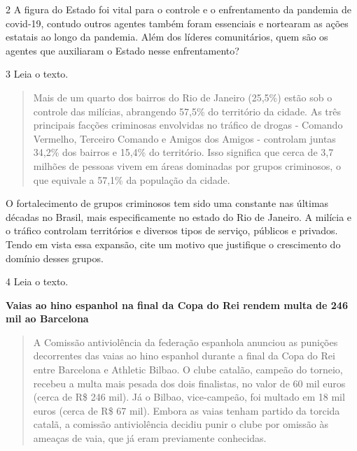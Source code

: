 \num{2} A figura do Estado foi vital para o controle e o enfrentamento
da pandemia de covid-19, contudo outros agentes também foram essenciais
e nortearam as ações estatais ao longo da pandemia. Além dos líderes
comunitários, quem são os agentes que auxiliaram o Estado nesse
enfrentamento?


\num{3} Leia o texto.

\begin{quote}
Mais de um quarto dos bairros do Rio de Janeiro (25,5\%) estão sob o
controle das milícias, abrangendo 57,5\% do território da cidade. As
três principais facções criminosas envolvidas no tráfico de drogas -
Comando Vermelho, Terceiro Comando e Amigos dos Amigos - controlam
juntas 34,2\% dos bairros e 15,4\% do território. Isso significa que
cerca de 3,7 milhões de pessoas vivem em áreas dominadas por grupos
criminosos, o que equivale a 57,1\% da população da cidade.
\end{quote}


O fortalecimento de grupos criminosos tem sido uma constante nas últimas
décadas no Brasil, mais especificamente no estado do Rio de Janeiro. A
milícia e o tráfico controlam territórios e diversos tipos de serviço,
públicos e privados. Tendo em vista essa expansão, cite um motivo que
justifique o crescimento do domínio desses grupos.


\num{4} Leia o texto.

\textbf{Vaias ao hino espanhol na final da Copa do Rei rendem multa de 246 mil ao Barcelona}

\begin{quote}
A Comissão antiviolência da federação espanhola anunciou as punições
decorrentes das vaias ao hino espanhol durante a final da Copa do Rei
entre Barcelona e Athletic Bilbao. O clube catalão, campeão do torneio,
recebeu a multa mais pesada dos dois finalistas, no valor de 60 mil
euros (cerca de R\$ 246 mil). Já o Bilbao, vice-campeão, foi multado em
18 mil euros (cerca de R\$ 67 mil). Embora as vaias tenham partido da
torcida catalã, a comissão antiviolência decidiu punir o clube por
omissão às ameaças de vaia, que já eram previamente conhecidas.
\end{quote}

